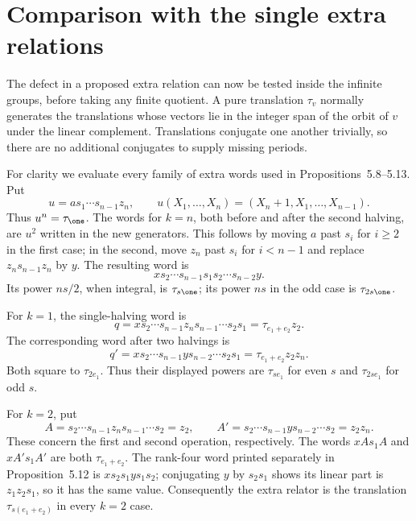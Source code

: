 \section{Comparison with the single extra relations}
The defect in a proposed extra relation can now be tested inside
the infinite groups, before taking any finite quotient. A pure
translation $\tau_v$ normally generates the translations whose
vectors lie in the integer span of the orbit of $v$ under the
linear complement. Translations conjugate one another trivially,
so there are no additional conjugates to supply missing periods.

For clarity we evaluate every family of extra words used in
Propositions~5.8--5.13. Put
\[
 u=as_1\cdots s_{n-1}z_n,
 \qquad u(X_1,\ldots,X_n)=(X_n+1,X_1,\ldots,X_{n-1}).
\]
Thus $u^n=\tau_\one$. The words for $k=n$, both before and
after the second halving, are $u^2$ written in the new generators.
This follows by moving $a$ past $s_i$ for $i\ge2$ in the first
case; in the second, move $z_n$ past $s_i$ for $i<n-1$ and
replace $z_ns_{n-1}z_n$ by $y$. The resulting word is
\[
 x s_2\cdots s_{n-1}s_1s_2\cdots s_{n-2}y.
\]
Its power $ns/2$, when integral, is $\tau_{s\one}$; its
power $ns$ in the odd case is $\tau_{2s\one}$.

For $k=1$, the single-halving word is
\[
 q=x s_2\cdots s_{n-1}z_ns_{n-1}\cdots s_2s_1
   =\tau_{e_1+e_2}z_2.
\]
The corresponding word after two halvings is
\[
 q'=x s_2\cdots s_{n-1}y s_{n-2}\cdots s_2s_1
    =\tau_{e_1+e_2}z_2z_n.
\]
Both square to $\tau_{2e_1}$. Thus their displayed powers
are $\tau_{se_1}$ for even $s$ and $\tau_{2se_1}$ for odd $s$.

For $k=2$, put
\[
 A=s_2\cdots s_{n-1}z_ns_{n-1}\cdots s_2=z_2,\qquad
 A'=s_2\cdots s_{n-1}y s_{n-2}\cdots s_2=z_2z_n.
\]
These concern the first and second operation, respectively.
The words $xAs_1A$ and $xA's_1A'$
are both $\tau_{e_1+e_2}$. The rank-four word printed separately
in Proposition~5.12 is $xs_2s_1ys_1s_2$; conjugating $y$
by $s_2s_1$ shows its linear part is $z_1z_2s_1$, so it has
the same value. Consequently the extra relator is the translation
$\tau_{s(e_1+e_2)}$ in every $k=2$ case.

